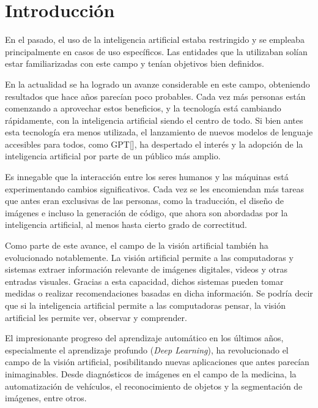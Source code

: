 \chapter*{Introducci\'on}\label{chapter:introduction}

En el pasado, el uso de la inteligencia artificial estaba restringido y se empleaba principalmente en casos de uso espec\'ificos. Las entidades que la utilizaban sol\'ian estar familiarizadas con este campo y ten\'ian objetivos bien definidos.

En la actualidad se ha logrado un avanze considerable en este campo, obteniendo resultados que hace a\~nos parec\'ian poco probables. Cada vez m\'as personas est\'an comenzando a aprovechar estos beneficios, y la tecnolog\'ia est\'a cambiando r\'apidamente, con la inteligencia artificial siendo el centro de todo. Si bien antes esta tecnolog\'ia era menos utilizada,  el lanzamiento de nuevos modelos de lenguaje accesibles para todos, como GPT[\cite{gpt2}], ha despertado el inter\'es y la adopci\'on de la inteligencia artificial por parte de un p\'ublico m\'as amplio.

Es innegable que la interacci\'on entre los seres humanos y las m\'aquinas est\'a experimentando cambios significativos. Cada vez se les encomiendan m\'as tareas que antes eran exclusivas de las personas, como la traducci\'on, el dise\~no de im\'agenes e incluso la generaci\'on de c\'odigo, que ahora son abordadas por la inteligencia artificial, al menos hasta cierto grado de correctitud.

Como parte de este avance, el campo de la visi\'on artificial tambi\'en ha evolucionado notablemente. La visi\'on artificial permite a las computadoras y sistemas extraer informaci\'on relevante de im\'agenes digitales, videos y otras entradas visuales. Gracias a esta capacidad, dichos sistemas pueden tomar medidas o realizar recomendaciones basadas en dicha informaci\'on. Se podr\'ia decir que si la inteligencia artificial permite a las computadoras pensar, la visi\'on artificial les permite ver, observar y comprender.

El impresionante progreso del aprendizaje autom\'atico en los \'ultimos a\~nos, especialmente el aprendizaje profundo (\textit{Deep Learning}), ha revolucionado el campo de la visi\'on artificial, posibilitando nuevas aplicaciones que antes parec\'ian inimaginables. Desde diagn\'osticos de im\'agenes en el campo de la medicina, la automatizaci\'on de veh\'iculos, el reconocimiento de objetos y la segmentaci\'on de im\'agenes, entre otros.

